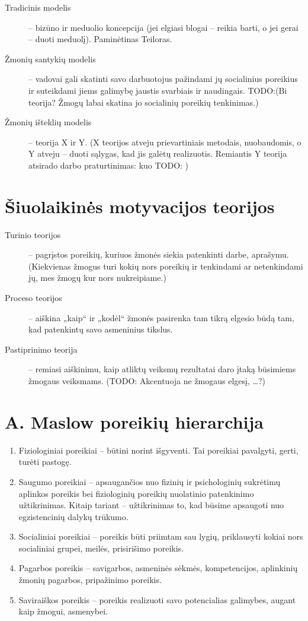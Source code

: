 \begin{description}
  \item[Tradicinis modelis] – bizūno ir meduolio koncepcija (jei elgiasi
    blogai – reikia barti, o jei gerai – duoti meduolį). Paminėtinas
    Teiloras.
  \item[Žmonių santykių modelis] – vadovai gali skatinti savo darbuotojus
    pažindami jų socialinius poreikius ir suteikdami jiems galimybę
    jaustis svarbiais ir naudingais. TODO:(Bi~ teorija? Žmogų labai skatina
    jo socialinių poreikių tenkinimas.)
  \item[Žmonių išteklių modelis] – teorija X ir Y. (X teorijos atveju
    prievartiniais metodais, nuobaudomis, o Y atveju – duoti sąlygas,
    kad jis galėtų realizuotis. Remiantis Y teorija atsirado darbo
    praturtinimas: kuo TODO: )
\end{description}

\section{Šiuolaikinės motyvacijos teorijos}

\begin{description}
  \item[Turinio teorijos] – pagrįstos poreikių, kuriuos žmonės siekia 
    patenkinti darbe, aprašymu. (Kiekvienas žmogus turi kokių nors
    poreikių ir tenkindami ar netenkindami jų, mes žmogų kur nors
    nukreipiame.)
  \item[Proceso teorijos] – aiškina „kaip“ ir „kodėl“ žmonės pasirenka
    tam tikrą elgesio būdą tam, kad patenkintų savo asmeninius tikslus.
  \item[Pastiprinimo teorija] – remiasi aiškinimu, kaip atliktų
    veiksmų rezultatai daro įtaką būsimiems žmogaus veiksmams. (TODO:
    Akcentuoja ne žmogaus elgesį, …?)
\end{description}

\section{A. Maslow poreikių hierarchija}

\begin{enumerate}
  \item Fiziologiniai poreikiai – būtini norint išgyventi. Tai poreikiai
    pavalgyti, gerti, turėti pastogę.
  \item Saugumo poreikiai – apsaugančios nuo fizinių ir psichologinių
    sukrėtimų aplinkos poreikis bei fiziologinių poreikių nuolatinio
    patenkinimo užtikrinimas. Kitaip tariant – užtikrinimas to, kad
    būsime apsaugoti nuo egzistencinių dalykų trūkumo.
  \item Socialiniai poreikiai – poreikis būti priimtam sau lygių,
    priklausyti kokiai nors socialiniai grupei, meilės, prisirišimo
    poreikis.
  \item Pagarbos poreikis – savigarbos, asmeninės sėkmės, kompetencijos,
    aplinkinių žmonių pagarbos, pripažinimo poreikis.
  \item Saviraiškos poreikis – poreikis realizuoti savo potencialias
    galimybes, augant kaip žmogui, asmenybei.
\end{enumerate}

